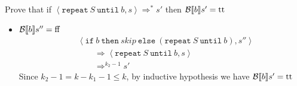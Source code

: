 \begin{exercise}{
    Prove that if $\left<\texttt{repeat}\ S\ \texttt{until}\ b, s\right> \Rightarrow^* s'$ then $\mathcal{B} \llbracket b \rrbracket s' = \text{tt}$
}
\begin{itemize}
\begin{itemize}
                    Thus $\Bool{ b} s'' = \Bool{ b} s' = \text{tt}$
                \item $\mathcal{B} \llbracket  b \rrbracket s'' = \text{ff}$
                    \begin{align*}
                        &\left<\texttt{if}\ b\ \texttt{then}\ skip\ \texttt{else}\ (\texttt{repeat}\ S\ \texttt{until}\ b), s''\right>
                        \\&\qquad \Rightarrow \left<\texttt{repeat}\ S\ \texttt{until}\ b, s\right>
                        \\&\qquad \Rightarrow^{k_2 - 1} s'
                    \end{align*}
                    Since $k_2 - 1 = k - k_1 - 1 \leq k$, by inductive hypothesis we have $\mathcal{B} \llbracket  b \rrbracket s' = \text{tt}$
            \end{itemize}
    \end{itemize}
\end{exercise}
